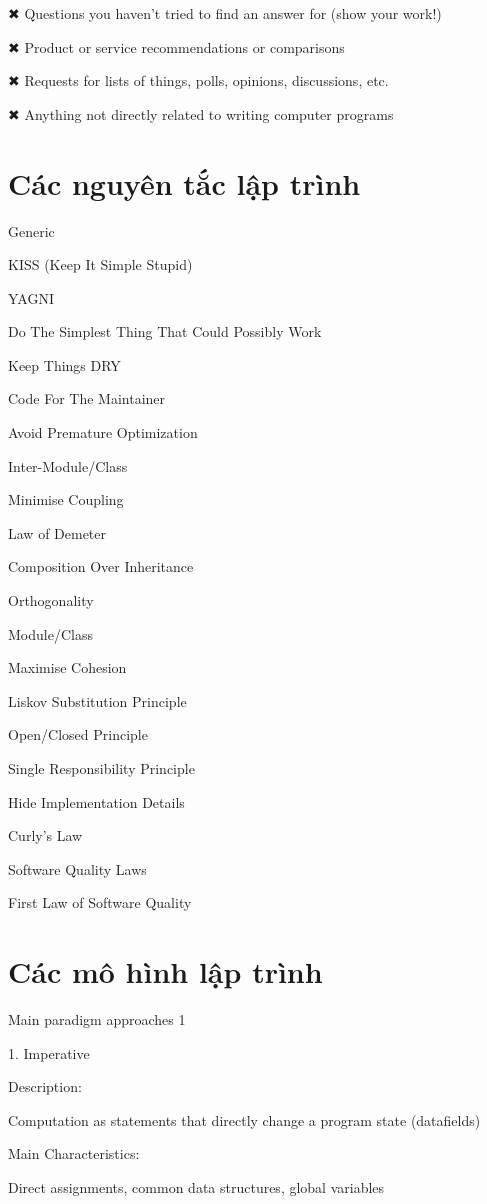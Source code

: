 ✖ Questions you haven't tried to find an answer for (show your work!)

✖ Product or service recommendations or comparisons

✖ Requests for lists of things, polls, opinions, discussions, etc.

✖ Anything not directly related to writing computer programs

\section{Các nguyên tắc lập trình}

Generic

KISS (Keep It Simple Stupid)

YAGNI

Do The Simplest Thing That Could Possibly Work

Keep Things DRY

Code For The Maintainer

Avoid Premature Optimization

Inter-Module/Class

Minimise Coupling

Law of Demeter

Composition Over Inheritance

Orthogonality

Module/Class

Maximise Cohesion

Liskov Substitution Principle

Open/Closed Principle

Single Responsibility Principle

Hide Implementation Details

Curly's Law

Software Quality Laws

First Law of Software Quality


\section{Các mô hình lập trình}

Main paradigm approaches 1

1. Imperative


Description:

Computation as statements that directly change a program state (datafields)

Main Characteristics:

Direct assignments, common data structures, global variables

